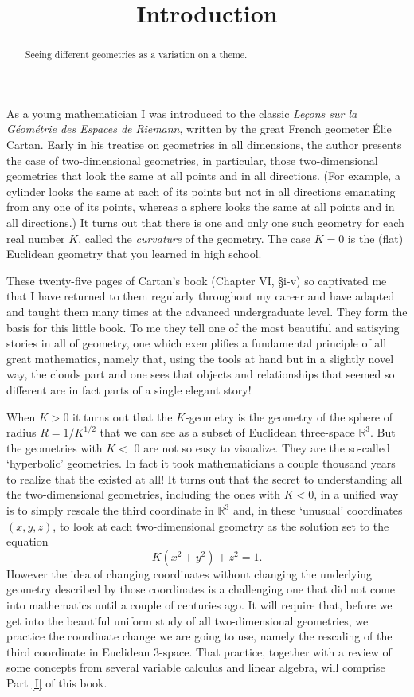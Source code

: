 \documentclass{ximera}
\title{Introduction}
\begin{document}
\begin{abstract}
Seeing different geometries as a variation on a theme.
\end{abstract}
\maketitle


As a young mathematician I was introduced to the classic \textit{Le\c{c}ons
sur la G\'{e}om\'{e}trie des Espaces de Riemann}, written by the great French
geometer \'{E}lie Cartan. Early in his treatise on geometries in all
dimensions, the author presents the case of two-dimensional geometries, in
particular, those two-dimensional geometries that look the same at all points
and in all directions. (For example, a cylinder looks the same at each of its
points but not in all directions emanating from any one of its points, whereas
a sphere looks the same at all points and in all directions.) It turns out
that there is one and only one such geometry for each real number $K$, called
the \textit{curvature} of the geometry. The case $K=0$ is the (flat) Euclidean
geometry that you learned in high school.

These twenty-five pages of Cartan's book (Chapter VI, \S i-v) so captivated me
that I have returned to them regularly throughout my career and have adapted
and taught them many times at the advanced undergraduate level. They form the
basis for this little book. To me they tell one of the most beautiful and
satisying stories in all of geometry, one which exemplifies a fundamental
principle of all great mathematics, namely that, using the tools at hand but
in a slightly novel way, the clouds part and one sees that objects and
relationships that seemed so different are in fact parts of a single elegant story!

When $K>0$ it turns out that the $K$-geometry is the geometry of the sphere of
radius $R=1/K^{1/2}$ that we can see as a subset of Euclidean three-space
$\mathbb{R}^{3}$. But the geometries with $K<$ $0$ are not so easy to
visualize. They are the so-called `hyperbolic' geometries. In fact it took
mathematicians a couple thousand years to realize that the existed at all! It
turns out that the secret to understanding all the two-dimensional geometries,
including the ones with $K<0$, in a unified way is to simply rescale the third
coordinate in $\mathbb{R}^{3}$ and, in these `unusual' coordinates $\left(
x,y,z\right)  $, to look at each two-dimensional geometry as the solution set
to the equation%
\[
K\left(  x^{2}+y^{2}\right)  +z^{2}=1.
\]
However the idea of changing coordinates without changing the underlying
geometry described by those coordinates is a challenging one that did not come
into mathematics until a couple of centuries ago. It will require that, before
we get into the beautiful uniform study of all two-dimensional geometries, we
practice the coordinate change we are going to use, namely the rescaling of
the third coordinate in Euclidean $3$-space. That practice, together with a
review of some concepts from several variable calculus and linear algebra,
will comprise Part \ref{I} of this book.
\end{document}
